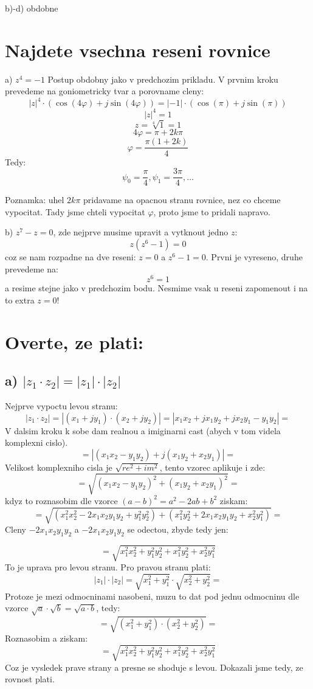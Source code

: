  b)-d) obdobne
 
 \section{Najdete vsechna reseni rovnice}
 a) $z^4=-1$
 Postup obdobny jako v predchozim prikladu. V prvnim kroku prevedeme na goniometricky tvar a porovname cleny:
 $$|z|^4\cdot (\operatorname{cos}(4\varphi)+j \operatorname{sin}(4\varphi)) = |-1|\cdot (\operatorname{cos}(\pi)+j \operatorname{sin}(\pi))$$
 $$|z|^4 = 1$$
 $$z = \sqrt[4]{1} = 1$$
 $$4\varphi = \pi+2k\pi$$
 $$\varphi = \frac{\pi (1+2k)}{4}$$
 Tedy:
 $$\psi_0 = \frac{\pi}{4}, \psi_1 = \frac{3\pi}{4}, \dots$$
 
Poznamka: uhel $2k\pi$ pridavame na opacnou stranu rovnice, nez co chceme vypocitat. Tady jsme chteli vypocitat $\varphi$, proto jsme to pridali napravo.

b) $z^7-z = 0$, zde nejprve musime upravit a vytknout jedno $z$:
$$z(z^6-1)= 0$$
coz se nam rozpadne na dve reseni:
$z = 0$ a $z^6 -1 = 0$. Prvni je vyreseno, druhe prevedeme na:
$$z^6 = 1$$
a resime stejne jako v predchozim bodu. Nesmime vsak u reseni zapomenout i na to extra $z=0$!

\section{Overte, ze plati:}
\subsection*{a) $|z_1\cdot z_2| = |z_1|\cdot |z_2|$}
Nejprve vypoctu levou stranu:
$$|z_1 \cdot z_2| = |(x_1+j y_1)\cdot (x_2+j y_2)| = |x_1 x_2 +j x_1 y_2 +j x_2 y_1 - y_1 y_2|=$$
V dalsim kroku k sobe dam realnou a imiginarni cast (abych v tom videla komplexni cislo).
$$=|(x_1 x_2 - y_1 y_2)+j(x_1 y_2 +x_2 y_1)|=$$
Velikost komplexniho cisla je $\sqrt{re^2 + im^2}$, tento vzorec aplikuje i zde:
$$=\sqrt{(x_1 x_2 - y_1 y_2)^2+(x_1 y_2+ x_2 y_1)^2}=$$
kdyz to roznasobim dle vzorce $(a-b)^2 = a^2 -2ab +b^2$ ziskam:
$$=\sqrt{(x_1^2 x_2^2 -2 x_1 x_2 y_1 y_2 + y_1^2 y_2^2)+(x_1^2 y_2^2 +2 x_1 x_2 y_1 y_2 +x_2^2 y_1^2)}=$$
Cleny $-2 x_1 x_2 y_1 y_2$ a $-2 x_1 x_2 y_1 y_2$ se odectou, zbyde tedy jen:

$$=\sqrt{x_1^2 x_2^2 +y_1^2 y_2^2 + x_1^2 y_2^2 + x_2^2 y_1^2}$$
To je uprava pro levou stranu. Pro pravou stranu plati:
$$|z_1|\cdot |z_2| = \sqrt{x_1^2+y_1^2}\cdot \sqrt{x_2^2 +y_2 ^2} = $$
Protoze je mezi odmocninami nasobeni, muzu to dat pod jednu odmocninu dle vzorce $\sqrt{a}\cdot \sqrt{b}=\sqrt{a\cdot b}$, tedy:
$$=\sqrt{(x_1^2+y_1^2)\cdot (x_2^2 +y_2 ^2)} = $$
Roznasobim a ziskam:
$$=\sqrt{x_1^2 x_2^2 +y_1^2 y_2^2 + x_1^2 y_2^2 + x_2^2 y_1^2}$$
Coz je vysledek prave strany a presne se shoduje s levou. Dokazali jsme tedy, ze rovnost plati.

